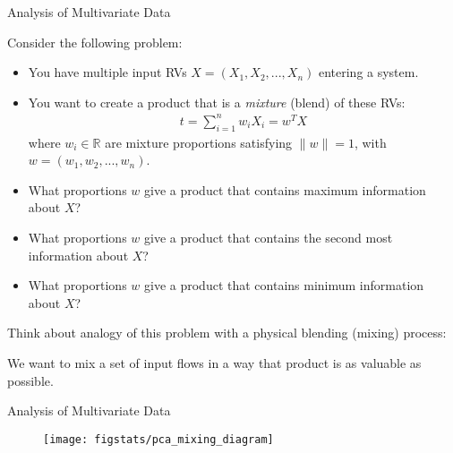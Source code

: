\documentclass[9pt]{beamer}
\begin{document}
%
\begin{frame}{Analysis of Multivariate Data}

Consider the following problem:
\begin{itemize}
\item You have multiple input RVs $X=(X_1,X_2,...,X_n)$ entering a system.
 
\item You want to create a product that is a {\em mixture} (blend) of these RVs:
\begin{align*}
t=\sum_{i=1}^nw_iX_i=w^TX
\end{align*}
where $w_i\in \mathbb{R}$ are  mixture proportions satisfying $\|w\|=1$, with $w=(w_1, w_2,...,w_n)$. 

\item What proportions $w$ give a product that contains maximum information about $X$?
\item What proportions $w$ give a product that contains the second most information about $X$?
\item What proportions $w$ give a product that contains minimum information about $X$?

\end{itemize}

Think about analogy of this problem with a physical blending (mixing) process: 
\begin{block}{}
We want to mix a set of input flows in a way that product is as valuable as possible.  
\end{block}

\end{frame}

%
\begin{frame}{Analysis of Multivariate Data}

\begin{figure}[!htb]
    \centering
	\texttt{[image: figstats/pca\_mixing\_diagram]}
\end{figure}

\end{frame}
\end{document}
